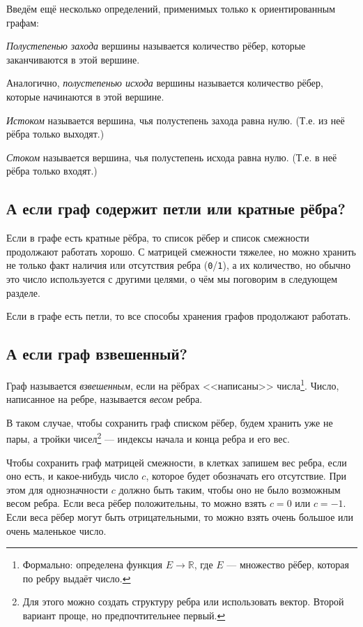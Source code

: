 \documentclass{article}
\begin{document}
	Введём ещё несколько определений, применимых только к ориентированным графам:
	
	\textit{Полустепенью захода} вершины называется количество рёбер, которые заканчиваются в этой вершине.
	
	Аналогично, \textit{полустепенью исхода} вершины называется количество рёбер, которые начинаются в этой вершине.
	
	\textit{Истоком} называется вершина, чья полустепень захода равна нулю. (Т.е. из неё рёбра только выходят.)
	
	\textit{Стоком} называется вершина, чья полустепень исхода равна нулю. (Т.е. в неё рёбра только входят.)
	
	\subsection{А если граф содержит петли или кратные рёбра?}
	
	Если в графе есть кратные рёбра, то список рёбер и список смежности продолжают работать хорошо. С матрицей смежности тяжелее, но можно хранить не только факт наличия или отсутствия ребра (\texttt{0}/\texttt{1}), а их количество, но обычно это число используется с другими целями, о чём мы поговорим в следующем разделе.
	
	Если в графе есть петли, то все способы хранения графов продолжают работать.
	
	\subsection{А если граф взвешенный?}
	
	Граф называется \textit{взвешенным}, если на рёбрах <<написаны>> числа\footnote{Формально: определена функция $E\to\mathbb{R}$, где $E$ --- множество рёбер, которая по ребру выдаёт число.}. Число, написанное на ребре, называется \textit{весом} ребра.
	
	В таком случае, чтобы сохранить граф списком рёбер, будем хранить уже не пары, а тройки чисел\footnote{Для этого можно создать структуру ребра или использовать вектор. Второй вариант проще, но предпочтительнее первый.} --- индексы начала и конца ребра и его вес.
	
	Чтобы сохранить граф матрицей смежности, в клетках запишем вес ребра, если оно есть, и какое-нибудь число $c$, которое будет обозначать его отсутствие. При этом для однозначности $c$ должно быть таким, чтобы оно не было возможным весом ребра. Если веса рёбер положительны, то можно взять $c = 0$ или $c=-1$. Если веса рёбер могут быть отрицательными, то можно взять очень большое или очень маленькое число.
	
\end{document}
